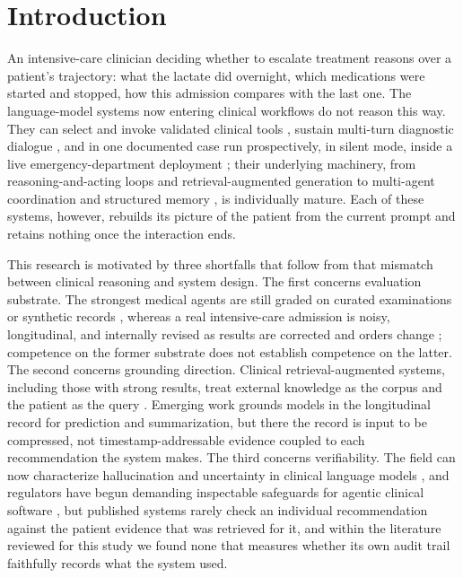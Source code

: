 \section{Introduction}

An intensive-care clinician deciding whether to escalate treatment reasons over a patient's
trajectory: what the lactate did overnight, which medications were started and stopped, how
this admission compares with the last one. The language-model systems now entering clinical
workflows do not reason this way. They can select and invoke validated clinical tools
\cite{gao2025txagent,liu2025riskagent}, sustain multi-turn diagnostic dialogue
\cite{palepu2025disease,saab2025multimodal}, and in one documented case run prospectively, in
silent mode, inside a live emergency-department deployment \cite{shashikumar2025sepsis}; their underlying machinery, from reasoning-and-acting
loops \cite{yao2023react} and retrieval-augmented generation \cite{lewis2020rag} to multi-agent
coordination \cite{wu2024autogen} and structured memory \cite{wu2025memory}, is individually mature.
Each of these systems, however, rebuilds its picture of the patient from the current prompt
and retains nothing once the interaction ends.

This research is motivated by three shortfalls that follow from that mismatch between
clinical reasoning and system design. The
first concerns evaluation substrate. The strongest medical agents are still graded on
curated examinations or synthetic records \cite{tang2024medagents,li2024agenthospital,jiang2025medagentbench}, whereas a real intensive-care admission is noisy, longitudinal, and
internally revised as results are corrected and orders change \cite{johnson2023mimic}; competence
on the former substrate does not establish competence on the latter. The second concerns
grounding direction. Clinical retrieval-augmented systems, including those with strong
results, treat external knowledge as the corpus and the patient as the query
\cite{zhao2025medrag,ke2025ragfitness}. Emerging work grounds models in the longitudinal record
for prediction and summarization, but there the record is input to be compressed, not
timestamp-addressable evidence coupled to each recommendation the system makes. The third
concerns verifiability. The field can now characterize hallucination
and uncertainty in clinical language models \cite{kim2025hallucinations,atf2025uncertainty}, and
regulators have begun demanding inspectable safeguards for agentic clinical software
\cite{tan2026undcs,weissman2025unregulated}, but published systems rarely check an individual
recommendation against the patient evidence that was retrieved for it, and within the
literature reviewed for this study we found none that measures whether its own audit trail
faithfully records what the system used.

